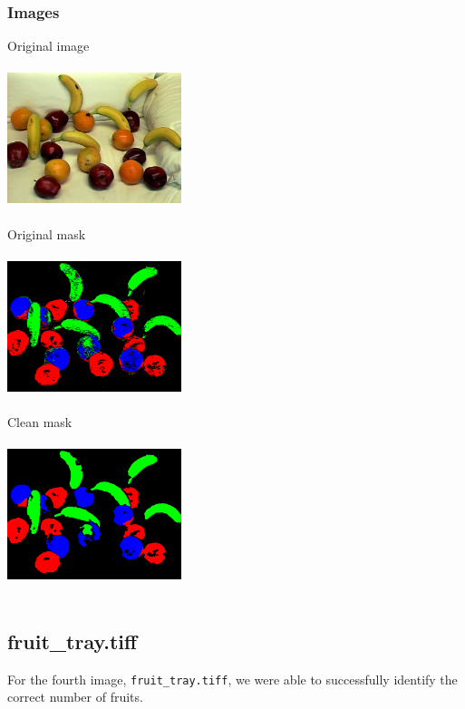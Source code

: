 \documentclass{article}
\begin{document}
\subsubsection{Images}
Original image\\~\\
\includegraphics[width=2in]{mixed_fruit3.png}\\~\\
Original mask\\~\\
\includegraphics[width=2in]{mixed_fruit3_step1.png}\\~\\
Clean mask\\~\\
\includegraphics[width=2in]{mixed_fruit3_step2.png}\\~\\

\subsection{fruit\_tray.tiff}
For the fourth image, \texttt{fruit\_tray.tiff}, we were able to successfully identify the correct number of fruits.
\end{document}
